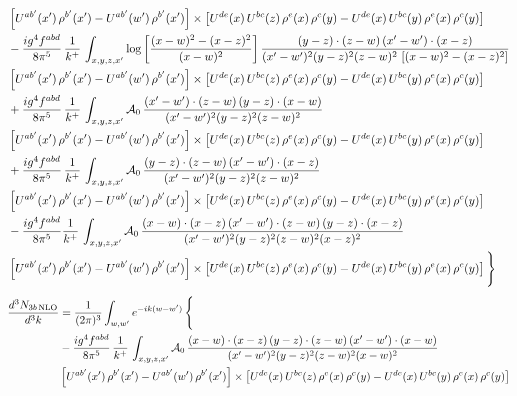 \documentclass[9pt]{article}
\numberwithin{equation}{section}
\begin{document}
{\begin{align*}
& \left[U^{ab'}(x')\,\rho^{b'}(x')-U^{ab'}(w')\, \rho^{b'}(x')\right]\times \left[U^{de}(x)\,U^{bc}(z)\, \rho^{e}(x)\,\rho^{c}(y)-U^{de}(x)\,U^{bc}(y)\,\rho^{e}(x)\,\rho^{c}(y)\right] \notag \\
& -\frac{ig^{4}f^{abd}}{8\pi^{5}}\,\frac{1}{k^{+}}\,\int_{x,y,z,x'}\log{\left[\frac{(x-w)^{2}-(x-z)^{2}}{(x-w)^{2}}\right]}\,
\frac{(y-z)\cdot(z-w)\,(x'-w')\cdot(x-z)}{(x'-w')^{2}(y-z)^{2}(z-w)^{2}\,\left[(x-w)^{2}-(x-z)^{2}\right]}\notag \\ & \left[U^{ab'}(x')\,\rho^{b'}(x')-U^{ab'}(w')\, \rho^{b'}(x')\right]\times \left[U^{de}(x)\,U^{bc}(z)\, \rho^{e}(x)\,\rho^{c}(y)-U^{de}(x)\,U^{bc}(y)\,\rho^{e}(x)\,\rho^{c}(y)\right] \notag \\
& +\frac{ig^{4}f^{abd}}{8\pi^{5}}\,\frac{1}{k^{+}}\,\int_{x,y,z,x'}\mathcal{A}_{0}\,
\frac{(x'-w')\cdot(z-w)\,(y-z)\cdot(x-w)}{(x'-w')^{2}(y-z)^{2}(z-w)^{2}}\notag \\
& \left[U^{ab'}(x')\,\rho^{b'}(x')-U^{ab'}(w')\, \rho^{b'}(x')\right]\times \left[U^{de}(x)\,U^{bc}(z)\, \rho^{e}(x)\,\rho^{c}(y)-U^{de}(x)\,U^{bc}(y)\,\rho^{e}(x)\,\rho^{c}(y)\right] \notag \\
& +\frac{ig^{4}f^{abd}}{8\pi^{5}}\,\frac{1}{k^{+}}\,\int_{x,y,z,x'}\mathcal{A}_{0}\,
\frac{(y-z)\cdot(z-w)\,(x'-w')\cdot(x-z)}{(x'-w')^{2}(y-z)^{2}(z-w)^{2}}\notag \\ & \left[U^{ab'}(x')\,\rho^{b'}(x')-U^{ab'}(w')\, \rho^{b'}(x')\right]\times \left[U^{de}(x)\,U^{bc}(z)\, \rho^{e}(x)\,\rho^{c}(y)-U^{de}(x)\,U^{bc}(y)\,\rho^{e}(x)\,\rho^{c}(y)\right] \notag \\
& -\frac{ig^{4}f^{abd}}{8\pi^{5}}\frac{1}{k^{+}}\,\int_{x,y,z,x'}\mathcal{A}_{0}\,
\frac{(x-w)\cdot(x-z)\,(x'-w')\cdot(z-w)\,(y-z)\cdot(x-z)}{(x'-w')^{2}(y-z)^{2}(z-w)^{2}(x-z)^{2}}\notag \\ & \left[U^{ab'}(x')\,\rho^{b'}(x')-U^{ab'}(w')\, \rho^{b'}(x')\right]\times \left[U^{de}(x)\,U^{bc}(z)\, \rho^{e}(x)\,\rho^{c}(y)-U^{de}(x)\,U^{bc}(y)\,\rho^{e}(x)\,\rho^{c}(y)\right]\Bigg\}
\end{align*}
\begin{align*}
\frac{d^{3}N_{3b\,\rm NLO}}{d^{3}k} & = \frac{1}{(2\pi)^{3}}\int_{w,w'}e^{-ik(w-w')}\,\Bigg\{\notag \\
&-\frac{ig^{4}f^{abd}}{8\pi^{5}}\,\frac{1}{k^{+}}\,\int_{x,y,z,x'}\mathcal{A}_{0}\,
\frac{(x-w)\cdot(x-z)\,(y-z)\cdot(z-w)\,(x'-w')\cdot(x-w)}{(x'-w')^{2}(y-z)^{2}(z-w)^{2}(x-w)^{2}}\notag \\ & \left[U^{ab'}(x')\,\rho^{b'}(x')-U^{ab'}(w')\, \rho^{b'}(x')\right]\times \left[U^{de}(x)\,U^{bc}(z)\, \rho^{e}(x)\,\rho^{c}(y)-U^{de}(x)\,U^{bc}(y)\,\rho^{e}(x)\,\rho^{c}(y)\right] \notag \\

\end{align*}}
\end{document}
